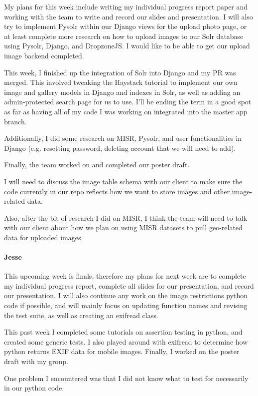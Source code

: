 \documentclass[onecolumn, draftclsnofoot,10pt, compsoc]{IEEEtran}
\begin{document}
\begin{flushleft}
My plans for this week include writing my individual progress report paper and working with the team to write and record our slides and presentation. I will also try to implement Pysolr within our Django views for the upload photo page, or at least complete more research on how to upload images to our Solr database using Pysolr, Django, and DropzoneJS. I would like to be able to get our upload image backend completed.
 
 
This week, I finished up the integration of Solr into Django and my PR was merged. This involved tweaking the Haystack tutorial to implement our own image and gallery models in Django and indexes in Solr, as well as adding an admin-protected search page for us to use. I'll be ending the term in a good spot as far as having all of my code I was working on integrated into the master app branch.
 
Additionally, I did some research on MISR, Pysolr, and user functionalities in Django (e.g. resetting password, deleting account that we will need to add).
 
Finally, the team worked on and completed our poster draft.
 
 
I will need to discuss the image table schema with our client to make sure the code currently in our repo reflects how we want to store images and other image-related data.
 
Also, after the bit of research I did on MISR, I think the team will need to talk with our client about how we plan on using MISR datasets to pull geo-related data for uploaded images.
 
\paragraph{Jesse}
 
This upcoming week is finals, therefore my plans for next week are to complete my individual progress report, complete all slides for our presentation, and record our presentation. I will also continue any work on the image restrictions python code if possible, and will mainly focus on updating function names and revising the test suite, as well as creating an exifread class.
 
 
This past week I completed some tutorials on assertion testing in python, and created some generic tests. I also played around with exifread to determine how python returns EXIF data for mobile images. Finally, I worked on the poster draft with my group.
 
 
One problem I encountered was that I did not know what to test for necessarily in our python code.
 

\end{flushleft}
\end{document}
